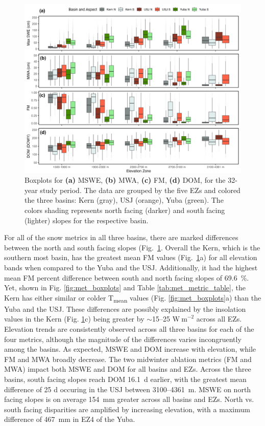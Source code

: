 \begin{figure}[t]
\includegraphics[width=\textwidth]{figures/ch2_figs/snow4_boxplot_v5.png}
\caption{Boxplots for \textbf{(a)} MSWE, \textbf{(b)} MWA, \textbf{(c)} FM, \textbf{(d)} DOM, for the 32-year study period. The data are grouped by the five EZs and colored the three basins: Kern (gray), USJ (orange), Yuba (green). The colors shading represents north facing (darker) and south facing (lighter) slopes for the respective basin.}
\label{fig:snow_boxplots}
\end{figure}


For all of the snow metrics in all three basins, there are marked differences between the north and south facing slopes (Fig.~\ref{fig:snow_boxplots}. Overall the Kern, which is the southern most basin, has the greatest mean FM values (Fig.~\ref{fig:snow_boxplots}a) for all elevation bands when compared to the Yuba and the USJ. Additionally, it had the highest mean FM percent difference between south and north facing slopes of 69.6~\%. Yet, shown in Fig. \ref{fig:met_boxplots} and Table \ref{tab:met_metric_table}, the Kern has either similar or colder T\textsubscript{mean} values (Fig. \ref{fig:met_boxplots}a) than the Yuba and the USJ. These differences are possibly explained by the insolation values in the Kern (Fig. \ref{fig:snow_boxplots}c) being greater by $\sim$15--25 $\mathrm{W~m}^{-2}$ across all EZs. Elevation trends are consistently observed across all three basins for each of the four metrics, although the magnitude of the differences varies incongruently among the basins. As expected, MSWE and DOM increase with elevation, while FM and MWA broadly decrease. The two midwinter ablation metrics (FM and MWA) impact both MSWE and DOM for all basins and EZs. Across the three basins, south facing slopes reach DOM 16.1~d earlier, with the greatest mean difference of 25 d occuring in the USJ between 3100--4361~m. MSWE on north facing slopes is on average 154~mm greater across all basins and EZs. North vs. south facing disparities are amplified by increasing elevation, with a maximum difference of 467~mm in EZ4 of the Yuba.

